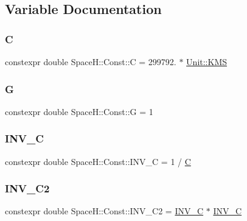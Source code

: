 \subsection{Variable Documentation}
\mbox{\label{namespace_space_h_1_1_const_a2d7bff2e7b11ffe2fcc07333089c83a4}} 
\subsubsection{\texorpdfstring{C}{C}}
{\footnotesize\ttfamily constexpr double Space\+H\+::\+Const\+::C = 299792. $\ast$ \mbox{\hyperlink{namespace_space_h_1_1_unit_a94c0a976eb50dcc88f04f3513049e8c3}{Unit\+::\+K\+MS}}}

\mbox{\label{namespace_space_h_1_1_const_ac17bec90d7d2b75f8f056347c7d6ced6}} 
\subsubsection{\texorpdfstring{G}{G}}
{\footnotesize\ttfamily constexpr double Space\+H\+::\+Const\+::G = 1}

\mbox{\label{namespace_space_h_1_1_const_a453eccad0d73caeedd6168a50d04d190}} 
\subsubsection{\texorpdfstring{I\+N\+V\+\_\+C}{INV\_C}}
{\footnotesize\ttfamily constexpr double Space\+H\+::\+Const\+::\+I\+N\+V\+\_\+C = 1 / \mbox{\hyperlink{namespace_space_h_1_1_const_a2d7bff2e7b11ffe2fcc07333089c83a4}{C}}}

\mbox{\label{namespace_space_h_1_1_const_ac438c0ca124c73e6a55ef0d4afd05551}} 
\subsubsection{\texorpdfstring{I\+N\+V\+\_\+\+C2}{INV\_C2}}
{\footnotesize\ttfamily constexpr double Space\+H\+::\+Const\+::\+I\+N\+V\+\_\+\+C2 = \mbox{\hyperlink{namespace_space_h_1_1_const_a453eccad0d73caeedd6168a50d04d190}{I\+N\+V\+\_\+C}} $\ast$ \mbox{\hyperlink{namespace_space_h_1_1_const_a453eccad0d73caeedd6168a50d04d190}{I\+N\+V\+\_\+C}}}

